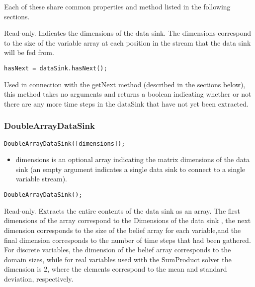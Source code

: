 Each of these share common properties and method listed in the following sections.



Read-only.  Indicates the dimensions of the data sink.  The dimensions correspond to the size of the variable array at each position in the stream that the data sink will be fed from.



\begin{lstlisting}
hasNext = dataSink.hasNext();
\end{lstlisting}

Used in connection with the getNext method (described in the sections below), this method takes no arguments and returns a boolean indicating whether or not there are any more time steps in the dataSink that have not yet been extracted.



\subsubsection{DoubleArrayDataSink}

\ifmatlab
\begin{lstlisting}
DoubleArrayDataSink([dimensions]);
\end{lstlisting}

\begin{itemize}
\item dimensions is an optional array indicating the matrix dimensions of the data sink (an empty argument indicates a single data sink to connect to a single variable stream).
\end{itemize}
\fi

\ifjava
\begin{lstlisting}
DoubleArrayDataSink();
\end{lstlisting}
\fi




Read-only.  Extracts the entire contents of the data sink as an array.  The first dimensions of the array correspond to the Dimensions of the data sink \ifmatlab, the next dimension corresponds to the size of the belief array for each variable,\fi and the final dimension corresponds to the number of time steps that had been gathered.  For discrete variables, the dimension of the belief array corresponds to the domain sizes, while for real variables used with the SumProduct solver the dimension is 2, where the elements correspond to the mean and standard deviation, respectively.



